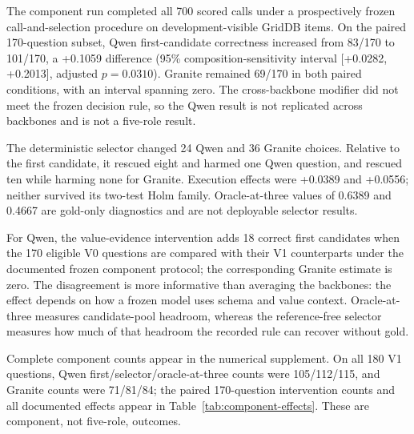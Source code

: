 \documentclass[information,article,submit,moreauthors]{Definitions/mdpi}
\begin{document}
The component run completed all 700 scored calls under a prospectively frozen call-and-selection procedure on development-visible GridDB items. On the paired 170-question subset, Qwen first-candidate correctness increased from 83/170 to 101/170, a +0.1059 difference (95\% composition-sensitivity interval [+0.0282, +0.2013], adjusted $p=0.0310$). Granite remained 69/170 in both paired conditions, with an interval spanning zero. The cross-backbone modifier did not meet the frozen decision rule, so the Qwen result is not replicated across backbones and is not a five-role result.

The deterministic selector changed 24 Qwen and 36 Granite choices. Relative to the first candidate, it rescued eight and harmed one Qwen question, and rescued ten while harming none for Granite. Execution effects were +0.0389 and +0.0556; neither survived its two-test Holm family. Oracle-at-three values of 0.6389 and 0.4667 are gold-only diagnostics and are not deployable selector results.

For Qwen, the value-evidence intervention adds 18 correct first candidates when the 170 eligible V0 questions are compared with their V1 counterparts under the documented frozen component protocol; the corresponding Granite estimate is zero. The disagreement is more informative than averaging the backbones: the effect depends on how a frozen model uses schema and value context. Oracle-at-three measures candidate-pool headroom, whereas the reference-free selector measures how much of that headroom the recorded rule can recover without gold.

Complete component counts appear in the numerical supplement. On all 180 V1 questions, Qwen first/selector/oracle-at-three counts were 105/112/115, and Granite counts were 71/81/84; the paired 170-question intervention counts and all documented effects appear in Table~\ref{tab:component-effects}. These are component, not five-role, outcomes.
\end{document}

